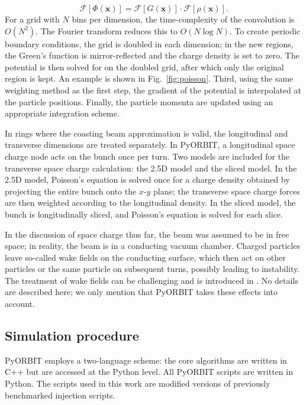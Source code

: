 %
\begin{equation}
    \mathcal{F}[\Phi(\mathbf{x})]
    =
    \mathcal{F}[G(\mathbf{x})] \cdot \mathcal{F}[\rho(\mathbf{x})].
\end{equation}
%
For a grid with $N$ bins per dimension, the time-complexity of the convolution is $O(N^2)$. The Fourier transform reduces this to $O(N \log N)$. To create periodic boundary conditions, the grid is doubled in each dimension; in the new regions, the Green's function is mirror-reflected and the charge density is set to zero. The potential is then solved for on the doubled grid, after which only the original region is kept. An example is shown in Fig.~\ref{fig:poisson}. Third, using the same weighting method as the first step, the gradient of the potential is interpolated at the particle positions. Finally, the particle momenta are updated using an appropriate integration scheme.

In rings where the coasting beam approximation is valid, the longitudinal and transverse dimensions are treated separately. In PyORBIT, a longitudinal space charge node acts on the bunch once per turn. Two models are included for the transverse space charge calculation: the 2.5D model and the sliced model. In the 2.5D model, Poisson’s equation is solved once for a charge density obtained by projecting the entire bunch onto the $x$-$y$ plane; the transverse space charge forces are then weighted according to the longitudinal density. In the sliced model, the bunch is longitudinally sliced, and Poisson’s equation is solved for each slice.

In the discussion of space charge thus far, the beam was assumed to be in free space; in reality, the beam is in a conducting vacuum chamber. Charged particles leave so-called wake fields on the conducting surface, which then act on other particles or the same particle on subsequent turns, possibly leading to instability. The treatment of wake fields can be challenging and is introduced in \cite{Chao1993}. No details are described here; we only mention that PyORBIT takes these effects into account.






\subsection{Simulation procedure}

PyORBIT employs a two-language scheme: the core algorithms are written in C++ but are accessed at the Python level. All PyORBIT scripts are written in Python. The scripts used in this work are modified versions of previously benchmarked injection scripts.

